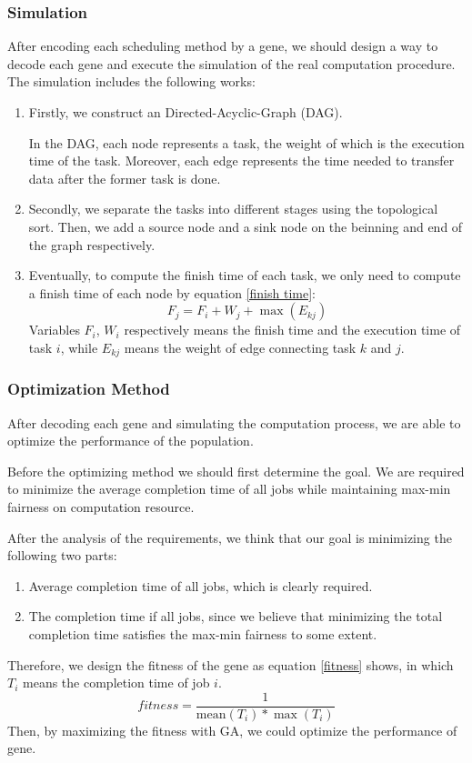 \documentclass{llncs}
\begin{document}
\subsubsection{Simulation}
After encoding each scheduling method by a gene, we should design a way to decode each gene and execute the simulation of the real computation procedure. The simulation includes the following works:
\begin{enumerate}
    \item Firstly, we construct an Directed-Acyclic-Graph (DAG). 
    
    In the DAG, each node represents a task, the weight of which is the execution time of the task. Moreover, each edge represents the time needed to transfer data after the former task is done.
    \item Secondly, we separate the tasks into different stages using the topological sort. Then, we add a source node and a sink node on the beinning and end of the graph respectively.
    \item Eventually, to compute the finish time of each task, we only need to compute a finish time of each node by equation \ref{finish time}:
    \begin{equation}
        F_j=F_i+W_j+\max \left( E_{kj} \right)
        \label{finish time}
    \end{equation}
    Variables $F_i$, $W_i$ respectively means the finish time and the execution time of task $i$, while $E_{kj}$ means the weight of edge connecting task $k$ and $j$.
\end{enumerate}
\subsubsection{Optimization Method}
After decoding each gene and simulating the computation process, we are able to optimize the performance of the population.

Before the optimizing method we should first determine the goal. We are required to minimize the average completion time of all jobs while maintaining max-min fairness on computation resource.

After the analysis of the requirements, we think that our goal is minimizing the following two parts:
\begin{enumerate}
    \item Average completion time of all jobs, which is clearly required.
    \item The completion time if all jobs, since we believe that minimizing the total completion time satisfies the max-min fairness to some extent.
\end{enumerate}
Therefore, we design the fitness of the gene as equation \ref{fitness} shows, in which $T_i$ means the completion time of job $i$.
\begin{equation}
    fitness=\frac{1}{\mathrm{mean}\left( T_i \right) *\max \left( T_i \right)}
    \label{fitness}
\end{equation}
Then, by maximizing the fitness with GA, we could optimize the performance of gene.
\end{document}
